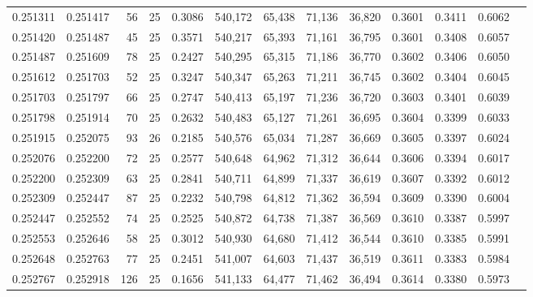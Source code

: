 \begin{tabular}{rrrrrrrrrrrrr}
0.251311 & 0.251417 &    56 &  25 &                                     0.3086 & 540,172 &  65,438 &  71,136 &  36,820 & 0.3601 & 0.3411 & 0.6062 \\
0.251420 & 0.251487 &    45 &  25 &                                     0.3571 & 540,217 &  65,393 &  71,161 &  36,795 & 0.3601 & 0.3408 & 0.6057 \\
0.251487 & 0.251609 &    78 &  25 &                                     0.2427 & 540,295 &  65,315 &  71,186 &  36,770 & 0.3602 & 0.3406 & 0.6050 \\
0.251612 & 0.251703 &    52 &  25 &                                     0.3247 & 540,347 &  65,263 &  71,211 &  36,745 & 0.3602 & 0.3404 & 0.6045 \\
0.251703 & 0.251797 &    66 &  25 &                                     0.2747 & 540,413 &  65,197 &  71,236 &  36,720 & 0.3603 & 0.3401 & 0.6039 \\
0.251798 & 0.251914 &    70 &  25 &                                     0.2632 & 540,483 &  65,127 &  71,261 &  36,695 & 0.3604 & 0.3399 & 0.6033 \\
0.251915 & 0.252075 &    93 &  26 &                                     0.2185 & 540,576 &  65,034 &  71,287 &  36,669 & 0.3605 & 0.3397 & 0.6024 \\
0.252076 & 0.252200 &    72 &  25 &                                     0.2577 & 540,648 &  64,962 &  71,312 &  36,644 & 0.3606 & 0.3394 & 0.6017 \\
0.252200 & 0.252309 &    63 &  25 &                                     0.2841 & 540,711 &  64,899 &  71,337 &  36,619 & 0.3607 & 0.3392 & 0.6012 \\
0.252309 & 0.252447 &    87 &  25 &                                     0.2232 & 540,798 &  64,812 &  71,362 &  36,594 & 0.3609 & 0.3390 & 0.6004 \\
0.252447 & 0.252552 &    74 &  25 &                                     0.2525 & 540,872 &  64,738 &  71,387 &  36,569 & 0.3610 & 0.3387 & 0.5997 \\
0.252553 & 0.252646 &    58 &  25 &                                     0.3012 & 540,930 &  64,680 &  71,412 &  36,544 & 0.3610 & 0.3385 & 0.5991 \\
0.252648 & 0.252763 &    77 &  25 &                                     0.2451 & 541,007 &  64,603 &  71,437 &  36,519 & 0.3611 & 0.3383 & 0.5984 \\
0.252767 & 0.252918 &   126 &  25 &                                     0.1656 & 541,133 &  64,477 &  71,462 &  36,494 & 0.3614 & 0.3380 & 0.5973 \\

\end{tabular}

